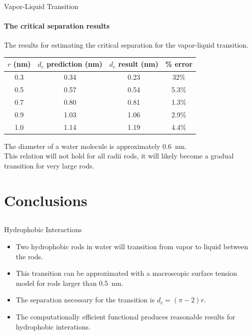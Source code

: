 \documentclass{beamer}
\begin{document}
\begin{frame}[fragile]{Vapor-Liquid Transition}
\framesubtitle{The critical separation results}
The results for estimating the critical separation for the vapor-liquid 
transition.
\begin{table}
\begin{tabular} {|c|c|c|c|}
\hline
$r$ (nm) & $d_c$ prediction (nm) & $d_c$ result (nm) & \% error \\
\hline
0.3 & 0.34 & 0.23 & 32\% \\
\hline
0.5 & 0.57 & 0.54 & 5.3\% \\
\hline
0.7 & 0.80 & 0.81 & 1.3\% \\
\hline
0.9 & 1.03 & 1.06 & 2.9\% \\
\hline
1.0 & 1.14 & 1.19 & 4.4\% \\
\hline
\end{tabular}
\end{table}
\pause 
The diameter of a water molecule is approximately 0.6~nm.\\
\vspace{0.5cm}
\pause
This relation will not hold for all radii rods, it will 
likely become a gradual transition for very large rods.
\end{frame}

\section{Conclusions}
\subsection*{}

\begin{frame}[fragile]{Hydrophobic Interactions}
\begin{itemize}
 \item <1-> Two hydrophobic rods in water will transition from vapor to liquid between the rods.
 \vspace{0.5cm}
 \item <2-> This transition can be approximated with a macroscopic surface tension model
  for rods larger than 0.5~nm.
 \vspace{0.5cm}
 \item <3-> The separation necessary for the transition is $d_c = (\pi-2)r$.
 \vspace{0.5cm}
 \item <4-> The computationally efficient functional produces reasonable results for
hydrophobic interations.
\end{itemize}
\end{frame}
\end{document}
